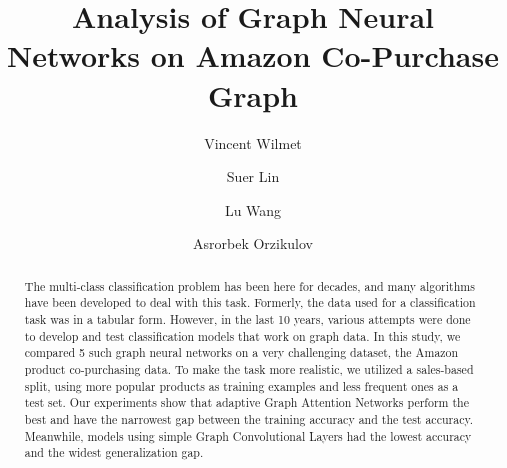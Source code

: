 \documentclass[sigconf, nonacm]{acmart}
\begin{document}
\title{Analysis of Graph Neural Networks on Amazon Co-Purchase Graph}


\author{Vincent Wilmet}
\author{Suer Lin}

\author{Lu Wang}

\author{Asrorbek Orzikulov}


\begin{abstract}
    The multi-class classification problem has been here for decades, and many algorithms have been developed to deal with this task. Formerly, the data used for a classification task was in a tabular form. However, in the last 10 years, various attempts were done to develop and test classification models that work on graph data. In this study, we compared 5 such graph neural networks on a very challenging dataset, the Amazon product co-purchasing data. To make the task more realistic, we utilized a sales-based split, using more popular products as training examples and less frequent ones as a test set. Our experiments show that adaptive Graph Attention Networks perform the best and have the narrowest gap between the training accuracy and the test accuracy. Meanwhile, models using simple Graph Convolutional Layers had the lowest accuracy and the widest generalization gap.
\end{abstract}


\maketitle
\end{document}
